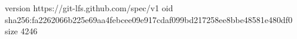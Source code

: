 version https://git-lfs.github.com/spec/v1
oid sha256:fa2262066b225e69aa4febcee09e917cdaf099bd217258ee8bbe48581e480df0
size 4246
